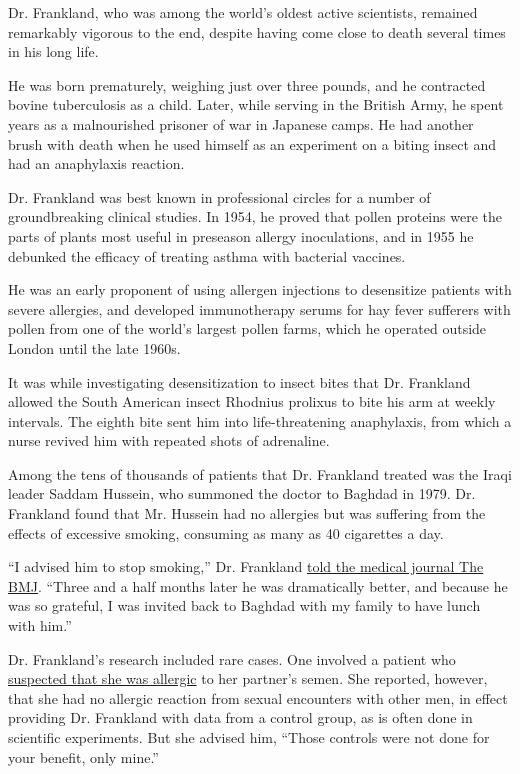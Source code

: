 Dr. Frankland, who was among the world's oldest active scientists,
remained remarkably vigorous to the end, despite having come close to
death several times in his long life.

He was born prematurely, weighing just over three pounds, and he
contracted bovine tuberculosis as a child. Later, while serving in the
British Army, he spent years as a malnourished prisoner of war in
Japanese camps. He had another brush with death when he used himself as
an experiment on a biting insect and had an anaphylaxis reaction.

Dr. Frankland was best known in professional circles for a number of
groundbreaking clinical studies. In 1954, he proved that pollen proteins
were the parts of plants most useful in preseason allergy inoculations,
and in 1955 he debunked the efficacy of treating asthma with bacterial
vaccines.

He was an early proponent of using allergen injections to desensitize
patients with severe allergies, and developed immunotherapy serums for
hay fever sufferers with pollen from one of the world's largest pollen
farms, which he operated outside London until the late 1960s.

It was while investigating desensitization to insect bites that Dr.
Frankland allowed the South American insect Rhodnius prolixus to bite
his arm at weekly intervals. The eighth bite sent him into
life-threatening anaphylaxis, from which a nurse revived him with
repeated shots of adrenaline.

Among the tens of thousands of patients that Dr. Frankland treated was
the Iraqi leader Saddam Hussein, who summoned the doctor to Baghdad in
1979. Dr. Frankland found that Mr. Hussein had no allergies but was
suffering from the effects of excessive smoking, consuming as many as 40
cigarettes a day.

``I advised him to stop smoking,'' Dr. Frankland
\href{https://search.proquest.com/openview/6aaa55a46c44a9fb31622a4a71d61f10/1?pq-origsite=gscholar\&cbl=2043523}{told
the medical journal The BMJ}. ``Three and a half months later he was
dramatically better, and because he was so grateful, I was invited back
to Baghdad with my family to have lunch with him.''

Dr. Frankland's research included rare cases. One involved a patient who
\href{https://books.google.com/books?id=dffSAwAAQBAJ\&pg=PA351\&lpg=PA351\&dq=\%22Those+controls+were+not+done+for+your+benefit,+only+mine\%22\&source=bl\&ots=lzpSVI_1uw\&sig=Uhmyajjgts8Xx0rjjVcmMm2jKSc\&hl=en\&sa=X\&ved=0ahUKEwiC58mH4evVAhUs54MKHddLBigQ6AEIJjAA\#v=onepage\&q=\%22Those\%20controls\%20were\%20not\%20done\%20for\%20your\%20benefit\%2C\%20only\%20mine\%22\&f=false}{suspected
that she was allergic} to her partner's semen. She reported, however,
that she had no allergic reaction from sexual encounters with other men,
in effect providing Dr. Frankland with data from a control group, as is
often done in scientific experiments. But she advised him, ``Those
controls were not done for your benefit, only mine.''

